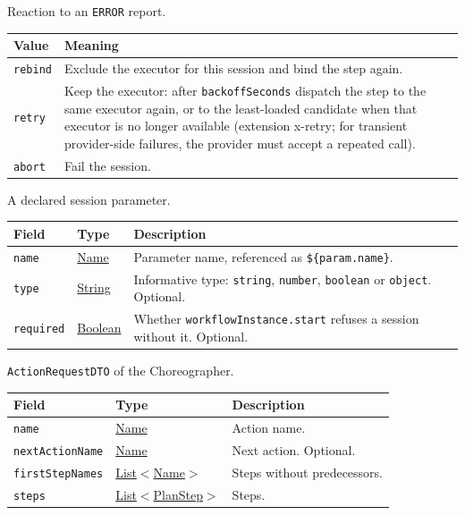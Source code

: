 \documentclass[a4paper]{arrowhead}
\newcommand{\mref}[1]{{\textcolor{ArrowheadPurple}{\hyperref[sec:model:#1]{#1}}}}
\newcommand{\pref}[1]{{\textcolor{ArrowheadGrey}{\hyperref[sec:model:primitives:#1]{#1}}}}
\begin{document}
Reaction to an \texttt{ERROR} report.

{\small
\begin{longtable}{|p{3.9cm}|p{11.9cm}|}

\hline
\rowcolor{gray!33} Value & Meaning \\ \hline
\endhead
\texttt{rebind} & Exclude the executor for this session and bind the step again. \\ \hline
\texttt{retry} & Keep the executor: after \texttt{backoff\allowbreak{}Seconds} dispatch the step to the same executor again, or to the least-loaded candidate when that executor is no longer available (extension x-retry; for transient provider-side failures, the provider must accept a repeated call). \\ \hline
\texttt{abort} & Fail the session. \\ \hline
\end{longtable}
}

A declared session parameter.

{\small
\begin{longtable}{|p{3.9cm}|p{4.4cm}|p{7.5cm}|}

\hline
\rowcolor{gray!33} Field & Type & Description \\ \hline
\endhead
\texttt{name} & \pref{Name} & Parameter name, referenced as \texttt{\$\{param.name\}}. \\ \hline
\texttt{type} & \pref{String} & Informative type: \texttt{string}, \texttt{number}, \texttt{boolean} or \texttt{object}. Optional. \\ \hline
\texttt{required} & \pref{Boolean} & Whether \texttt{workflow\allowbreak{}Instance.\allowbreak{}start} refuses a session without it. Optional. \\ \hline
\end{longtable}
}

\texttt{Action\allowbreak{}RequestDTO} of the Choreographer.

{\small
\begin{longtable}{|p{3.9cm}|p{4.4cm}|p{7.5cm}|}

\hline
\rowcolor{gray!33} Field & Type & Description \\ \hline
\endhead
\texttt{name} & \pref{Name} & Action name. \\ \hline
\texttt{next\allowbreak{}Action\allowbreak{}Name} & \pref{Name} & Next action. Optional. \\ \hline
\texttt{first\allowbreak{}Step\allowbreak{}Names} & \pref{List}$<$\pref{Name}$>$ & Steps without predecessors. \\ \hline
\texttt{steps} & \pref{List}$<$\mref{PlanStep}$>$ & Steps. \\ \hline
\end{longtable}
}
\end{document}
